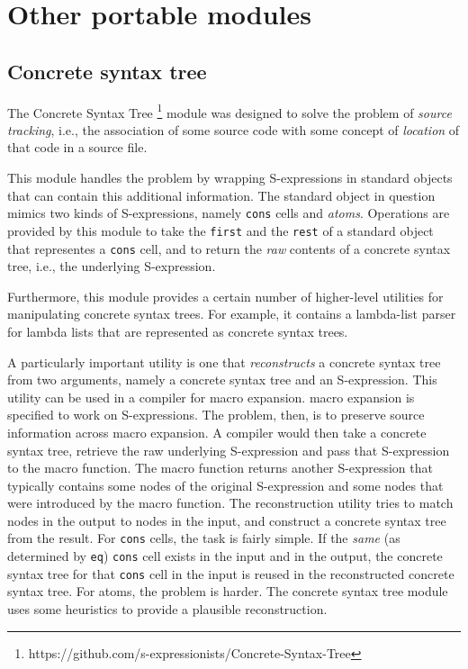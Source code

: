 \chapter{Other portable modules}

\section{Concrete syntax tree}
\label{sec-concrete-syntax-tree}

The Concrete Syntax Tree%
\footnote{https://github.com/s-expressionists/Concrete-Syntax-Tree}
module was designed to solve the problem of \emph{source tracking},
i.e., the association of some source code with some concept of
\emph{location} of that code in a source file.

This module handles the problem by wrapping S-expressions in standard
objects that can contain this additional information.  The standard
object in question mimics two kinds of S-expressions, namely
\texttt{cons} cells and \emph{atoms}.  Operations are provided by this
module to take the \texttt{first} and the \texttt{rest} of a standard
object that representes a \texttt{cons} cell, and to return the
\emph{raw} contents of a concrete syntax tree, i.e., the underlying
S-expression.

Furthermore, this module provides a certain number of higher-level
utilities for manipulating concrete syntax trees.  For example, it
contains a lambda-list parser for lambda lists that are represented as
concrete syntax trees.

A particularly important utility is one that \emph{reconstructs} a
concrete syntax tree from two arguments, namely a concrete syntax tree
and an S-expression.  This utility can be used in a compiler for macro
expansion.  \commonlisp{} macro expansion is specified to work on
S-expressions.  The problem, then, is to preserve source information
across macro expansion.  A compiler would then take a concrete syntax
tree, retrieve the raw underlying S-expression and pass that
S-expression to the macro function.  The macro function returns
another S-expression that typically contains some nodes of the
original S-expression and some nodes that were introduced by the macro
function.  The reconstruction utility tries to match nodes in the
output to nodes in the input, and construct a concrete syntax tree
from the result.  For \texttt{cons} cells, the task is fairly simple.
If the \emph{same} (as determined by \texttt{eq}) \texttt{cons} cell
exists in the input and in the output, the concrete syntax tree for
that \texttt{cons} cell in the input is reused in the reconstructed
concrete syntax tree.  For atoms, the problem is harder.  The concrete
syntax tree module uses some heuristics to provide a plausible
reconstruction.

